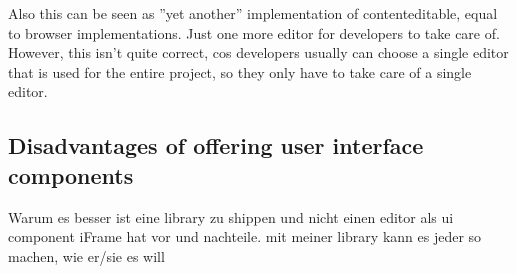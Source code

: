 Also this can be seen as ''yet another'' implementation of contenteditable, equal to browser implementations. Just one more editor for developers to take care of. However, this isn't quite correct, cos developers usually can choose a single editor that is used for the entire project, so they only have to take care of a single editor.

\subsection{Disadvantages of offering user interface components}

Warum es besser ist eine library zu shippen und nicht einen editor als ui component
iFrame hat vor und nachteile. mit meiner library kann es jeder so machen, wie er/sie es will


